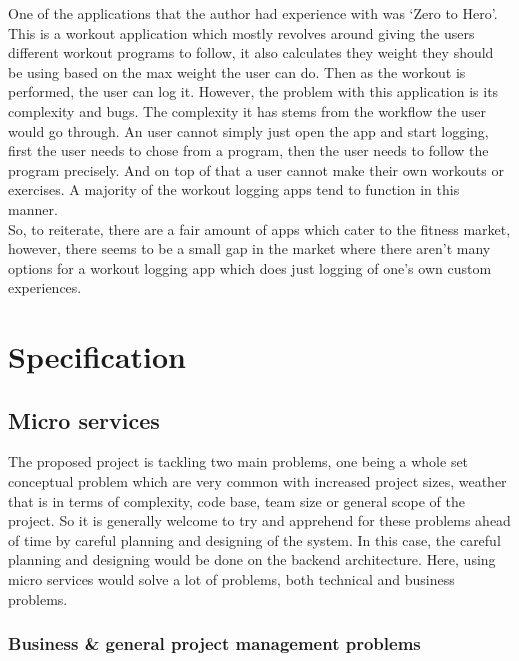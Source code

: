 \documentclass{article}
\newcommand{\vspaceconst}{-2ex}
\begin{document}
\begin{multicols}{2}
One of the applications that the author had experience with was `Zero to Hero'\cite{zerotohero}. This is a workout application which mostly revolves around giving the users different workout programs to follow, it also calculates they weight they should be using based on the max weight the user can do. Then as the workout is performed, the user can log it. However, the problem with this application is its complexity and bugs. The complexity it has stems from the workflow the user would go through. An user cannot simply just open the app and start logging, first the user needs to chose from a program, then the user needs to follow the program precisely. And on top of that a user cannot make their own workouts or exercises. A majority of the workout logging apps tend to function in this manner.\\
So, to reiterate, there are a fair amount of apps which cater to the fitness market, however, there seems to be a small gap in the market where there aren't many options for a workout logging app which does just logging of one's own custom experiences.\\

\section{Specification}
\vspace{\vspaceconst}

\subsection{Micro services}
\vspace{\vspaceconst}

The proposed project is tackling two main problems, one being a whole set conceptual problem which are very common with increased project sizes, weather that is in terms of complexity, code base, team size or general scope of the project. So it is generally welcome to try and apprehend for these problems ahead of time by careful planning and designing of the system. In this case, the careful planning and designing would be done on the backend architecture. Here, using micro services would solve a lot of problems, both technical and business problems.\\

\subsubsection{Business \& general project management problems}
\vspace{\vspaceconst}


\end{multicols}
\end{document}
